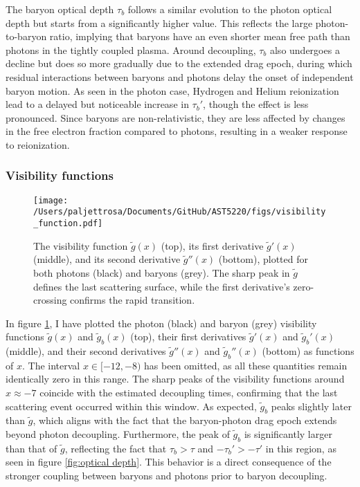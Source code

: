 \documentclass{aa}
\numberwithin{equation}{section}
\numberwithin{table}{section}
\numberwithin{figure}{section}
\begin{document}
The baryon optical depth $\tau_b$ follows a similar evolution to the photon optical depth but starts from a significantly higher value. This reflects the large photon-to-baryon ratio, implying that baryons have an even shorter mean free path than photons in the tightly coupled plasma. Around decoupling, $\tau_b$ also undergoes a decline but does so more gradually due to the extended drag epoch, during which residual interactions between baryons and photons delay the onset of independent baryon motion. As seen in the photon case, Hydrogen and Helium reionization lead to a delayed but noticeable increase in $\tau_b'$, though the effect is less pronounced. Since baryons are non-relativistic, they are less affected by changes in the free electron fraction compared to photons, resulting in a weaker response to reionization.


\subsubsection{Visibility functions}

\begin{figure}
  \centering
  \texttt{[image: /Users/paljettrosa/Documents/GitHub/AST5220/figs/visibility\_function.pdf]}
  \caption{The visibility function $\tilde{g}(x)$ (top), its first derivative $\tilde{g}'(x)$ (middle), and its second derivative $\tilde{g}''(x)$ (bottom), plotted for both photons (black) and baryons (grey). The sharp peak in $\tilde{g}$ defines the last scattering surface, while the first derivative's zero-crossing confirms the rapid transition. 
  }\label{fig:visibility function}
\end{figure}

In figure \ref{fig:visibility function}, I have plotted the photon (black) and baryon (grey) visibility functions $\tilde{g}(x)$ and $\tilde{g}_b(x)$ (top), their first derivatives $\tilde{g}'(x)$ and $\tilde{g}_b'(x)$ (middle), and their second derivatives $\tilde{g}''(x)$ and $\tilde{g}_b''(x)$ (bottom) as functions of $x$. The interval $x\in[-12,-8)$ has been omitted, as all these quantities remain identically zero in this range. The sharp peaks of the visibility functions around $x \approx -7$ coincide with the estimated decoupling times, confirming that the last scattering event occurred within this window. As expected, $\tilde{g}_b$ peaks slightly later than $\tilde{g}$, which aligns with the fact that the baryon-photon drag epoch extends beyond photon decoupling. Furthermore, the peak of $\tilde{g}_b$ is significantly larger than that of $\tilde{g}$, reflecting the fact that $\tau_b > \tau$ and $-\tau_b' > -\tau'$ in this region, as seen in figure \ref{fig:optical depth}. This behavior is a direct consequence of the stronger coupling between baryons and photons prior to baryon decoupling.
\end{document}
